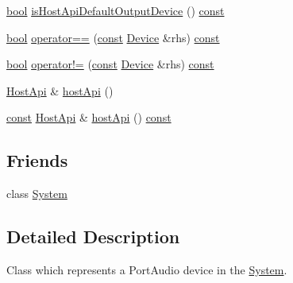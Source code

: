 \begin{DoxyCompactItemize}
\item 
\hyperlink{mac_2config_2i386_2lib-src_2libsoxr_2soxr-config_8h_abb452686968e48b67397da5f97445f5b}{bool} \hyperlink{classportaudio_1_1_device_a2c071652044b9303b91b4e3c231139dd}{is\+Host\+Api\+Default\+Output\+Device} () \hyperlink{getopt1_8c_a2c212835823e3c54a8ab6d95c652660e}{const} 
\item 
\hyperlink{mac_2config_2i386_2lib-src_2libsoxr_2soxr-config_8h_abb452686968e48b67397da5f97445f5b}{bool} \hyperlink{classportaudio_1_1_device_a45044b8812935745e8ac6156af024773}{operator==} (\hyperlink{getopt1_8c_a2c212835823e3c54a8ab6d95c652660e}{const} \hyperlink{classportaudio_1_1_device}{Device} \&rhs) \hyperlink{getopt1_8c_a2c212835823e3c54a8ab6d95c652660e}{const} 
\item 
\hyperlink{mac_2config_2i386_2lib-src_2libsoxr_2soxr-config_8h_abb452686968e48b67397da5f97445f5b}{bool} \hyperlink{classportaudio_1_1_device_af17f36b9ffc8188f17525597f4e97619}{operator!=} (\hyperlink{getopt1_8c_a2c212835823e3c54a8ab6d95c652660e}{const} \hyperlink{classportaudio_1_1_device}{Device} \&rhs) \hyperlink{getopt1_8c_a2c212835823e3c54a8ab6d95c652660e}{const} 
\item 
\hyperlink{classportaudio_1_1_host_api}{Host\+Api} \& \hyperlink{classportaudio_1_1_device_acda90ddd84617d9f2bc79f83985d49fd}{host\+Api} ()
\item 
\hyperlink{getopt1_8c_a2c212835823e3c54a8ab6d95c652660e}{const} \hyperlink{classportaudio_1_1_host_api}{Host\+Api} \& \hyperlink{classportaudio_1_1_device_a1d760692601c7f753e1619bf28bcc86a}{host\+Api} () \hyperlink{getopt1_8c_a2c212835823e3c54a8ab6d95c652660e}{const} 
\end{DoxyCompactItemize}
\subsection*{Friends}
\begin{DoxyCompactItemize}
\item 
class \hyperlink{classportaudio_1_1_device_af18a9ee98e70982bfe2975391d7221a5}{System}
\end{DoxyCompactItemize}


\subsection{Detailed Description}
Class which represents a Port\+Audio device in the \hyperlink{classportaudio_1_1_system}{System}. 

